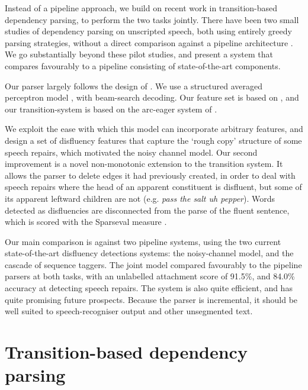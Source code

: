 \documentclass[11pt,letterpaper]{article}
\begin{document}
Instead of a pipeline approach, we build on recent work in transition-based dependency
parsing, to perform the two tasks jointly.
There have been two small studies of dependency parsing on unscripted speech,
both using entirely greedy parsing strategies, without a direct comparison
against a pipeline architecture \citep{jorgensen:07,rasooli:13}.  We go substantially
beyond these pilot studies, and present a system that compares favourably to a
pipeline consisting of state-of-the-art components.

Our parser largely follows the design of \citet{zhang:cl11}. We use a structured averaged
perceptron model \citep{collins:02}, with beam-search decoding. Our feature set
is based on \citet{zhang:cl11}, and our transition-system is based on the arc-eager
system of \citet{nivre:03}.

We exploit the ease with which this model can incorporate arbitrary features,
and design a set of disfluency features that capture the
`rough copy' structure of some speech repairs, which motivated the
\citet{Johnson04a} noisy channel model.
Our second improvement is a novel non-monotonic extension to the transition
system. It allows the parser to delete edges it had previously created, in order
to deal with speech repairs where the head of an apparent constituent is disfluent,
but some of its apparent leftward children are not (e.g. \emph{pass the salt uh pepper}).
Words detected as disfluencies are disconnected from the parse of the fluent sentence,
which is scored with the Sparseval measure \citep{sparseval}.

Our main comparison is against two pipeline systems, using the two current 
state-of-the-art disfluency detections systems: the \citet{Johnson04a} noisy-channel
model, and the \citet{qian:13} cascade of sequence taggers.  The joint model
compared favourably to the pipeline parsers at both tasks, with an unlabelled
attachment score of 91.5\%, and 84.0\% accuracy at detecting speech repairs.
The system is also quite efficient, and has quite promising future prospects.
Because the parser is incremental, it should be well suited
to speech-recogniser output and other unsegmented text.

\section{Transition-based dependency parsing}
\end{document}

